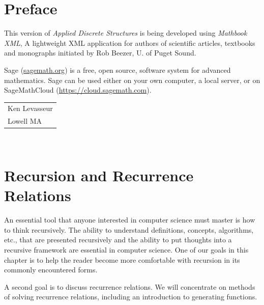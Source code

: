 \documentclass[10pt,]{book}
\theoremstyle{plain}
\theoremstyle{definition}
\theoremstyle{definition}
\theoremstyle{definition}
\theoremstyle{definition}
\numberwithin{equation}{section}
\begin{document}
\chapter*{Preface}\label{preface-1}
This version of \emph{Applied Discrete Structures} is being developed using \emph{Mathbook XML}, A lightweight XML application for authors of scientific articles, textbooks and monographs initiated by Rob Beezer, U. of Puget Sound.  %
\par
Sage (\href{http://sagemath.org}{sagemath.org}) is a free, open source, software system for advanced mathematics.  Sage can be used either on your own computer, a local server, or on SageMathCloud (\href{https://cloud.sagemath.com}{https://cloud.sagemath.com}). %
\par\hfill\begin{tabular}{l@{}}
Ken Levasseur\\
Lowell MA
\end{tabular}\\\par
\setcounter{tocdepth}{1}
\renewcommand*\contentsname{Contents}
\tableofcontents
\mainmatter
\typeout{************************************************}
\typeout{************************************************}
\chapter[Recursion and Recurrence Relations]{Recursion and Recurrence Relations}\label{chapter_8}
\typeout{************************************************}
\typeout{************************************************}
An essential tool that anyone interested in computer science must master is how to think recursively. The ability to understand definitions, concepts,
algorithms, etc., that are presented recursively and the ability to put thoughts into a recursive framework are essential in computer science. One of our goals in this chapter is to help the reader become more comfortable with recursion in its commonly encountered forms.%
\par
A second goal is to discuss recurrence relations. We will concentrate on methods of solving recurrence relations, including an introduction to generating
functions.
%
\typeout{************************************************}
\typeout{************************************************}
\end{document}
